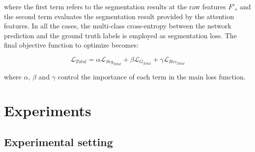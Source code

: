 \documentclass[journal]{IEEEtran}
\begin{document}
where the first term refers to the segmentation results at the raw features $F'_s$ and the second term evaluates the segmentation result provided by the attention features. In all the cases, the multi-class cross-entropy between the network prediction and the ground truth labels is employed as segmentation loss. The final objective function to optimize becomes:



\begin{equation}
    \mathcal{L}_{Total} = \alpha \mathcal{L}_{Seg_{Total}} + \beta \mathcal{L}_{G_{Total}}
    + \gamma \mathcal{L}_{Rec_{Total}}
    \label{eq:total_loss}
\end{equation}

where $\alpha$, $\beta$ and $\gamma$ control the importance of each term in the main loss function.

\section{Experiments}
\label{sec:Experiments}





\subsection{\textbf{Experimental setting}}
\end{document}
